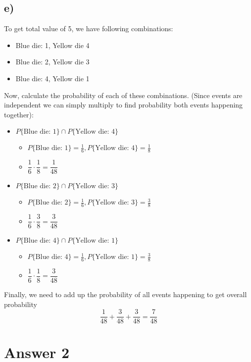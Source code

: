 \documentclass[12pt]{article}
\begin{document}
\subsection*{e)} 
To get total value of 5, we have following combinations: 
\begin{itemize}
    \item Blue die: 1, Yellow die 4 
    \item Blue die: 2, Yellow die 3 
    \item Blue die: 4, Yellow die 1 
\end{itemize}
Now, calculate the probability of each of these combinations. (Since events are independent we can simply multiply to find probability both events happening together): 
\begin{itemize}
    \item $P\{\text{Blue die: 1}\} \cap P\{\text{Yellow die: 4}\}$
    \begin{itemize}
        \item $P\{\text{Blue die: 1}\}  = \frac{1}{6}, P\{\text{Yellow die: 4}\}= \frac{1}{8} $
        \item $\dfrac{1}{6} \cdot \dfrac{1}{8} = \dfrac{1}{48}$
    \end{itemize}
    \item $P\{\text{Blue die: 2}\} \cap P\{\text{Yellow die: 3}\}$
    \begin{itemize}
        \item $P\{\text{Blue die: 2}\}  = \frac{1}{6}, P\{\text{Yellow die: 3}\}= \frac{3}{8} $
        \item $\dfrac{1}{6} \cdot \dfrac{3}{8} = \dfrac{3}{48}$
    \end{itemize}
    \item $P\{\text{Blue die: 4}\} \cap P\{\text{Yellow die: 1}\}$
    \begin{itemize}
        \item $P\{\text{Blue die: 4}\}  = \frac{1}{6}, P\{\text{Yellow die: 1}\}= \frac{3}{8} $
        \item $\dfrac{1}{6} \cdot \dfrac{1}{8} = \dfrac{3}{48}$
    \end{itemize}
\end{itemize}
Finally, we need to add up the probability of all events happening to get overall probability
$$\dfrac{1}{48} + \dfrac{3}{48} + \dfrac{3}{48} = \dfrac{7}{48}$$
\section*{Answer 2}
\end{document}
